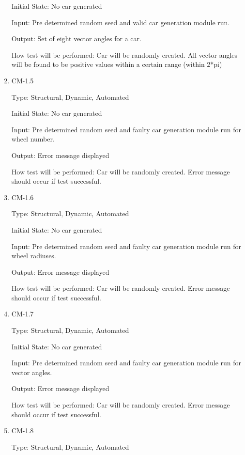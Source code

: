 \documentclass[12pt, titlepage]{article}
\begin{document}
\begin{enumerate}
Initial State: No car generated
					
Input: Pre determined random seed and valid car generation module run.
					
Output: Set of eight vector angles for a car.
					
How test will be performed: Car will be randomly created. All vector angles will 
be found to be positive values within a certain range (within 2*pi)

\item{CM-1.5\\}

Type: Structural, Dynamic, Automated
					
Initial State: No car generated
					
Input: Pre determined random seed and faulty car generation module run for wheel 
number.
					
Output: Error message displayed
					
How test will be performed:  Car will be randomly created. Error message should 
occur if test successful.

\item{CM-1.6\\}

Type: Structural, Dynamic, Automated
					
Initial State: No car generated
					
Input: Pre determined random seed and faulty car generation module run for wheel 
radiuses.
					
Output: Error message displayed
					
How test will be performed: Car will be randomly created. Error message should 
occur if test successful.

\item{CM-1.7\\}

Type: Structural, Dynamic, Automated
					
Initial State: No car generated
					
Input: Pre determined random seed and faulty car generation module run for 
vector angles.
					
Output: Error message displayed
					
How test will be performed: Car will be randomly created. Error message should 
occur if test successful.

\item{CM-1.8\\}

Type: Structural, Dynamic, Automated
					

\end{enumerate}
\end{document}
